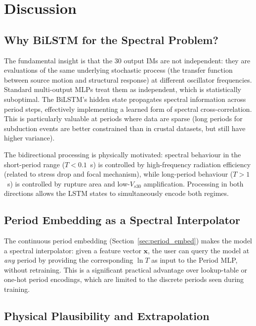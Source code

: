 \documentclass[12pt,a4paper]{article}
\begin{document}
\section{Discussion}
\label{sec:discussion}

\subsection{Why BiLSTM for the Spectral Problem?}

The fundamental insight is that the 30 output IMs are not independent: they
are evaluations of the same underlying stochastic process (the transfer function
between source motion and structural response) at different oscillator
frequencies.
Standard multi-output MLPs treat them as independent, which is statistically
suboptimal.
The BiLSTM's hidden state propagates spectral information across period steps,
effectively implementing a learned form of spectral cross-correlation.
This is particularly valuable at periods where data are sparse (long periods
for subduction events are better constrained than in crustal datasets, but
still have higher variance).

The bidirectional processing is physically motivated: spectral behaviour in
the short-period range ($T < 0.1$~s) is controlled by high-frequency radiation
efficiency (related to stress drop and focal mechanism), while long-period
behaviour ($T > 1$~s) is controlled by rupture area and low-$V_{s30}$
amplification.
Processing in both directions allows the LSTM states to simultaneously encode
both regimes.

\subsection{Period Embedding as a Spectral Interpolator}

The continuous period embedding (Section~\ref{sec:period_embed}) makes the
model a spectral interpolator: given a feature vector $\mathbf{x}$, the user
can query the model at \emph{any} period by providing the corresponding
$\ln T$ as input to the Period MLP, without retraining.
This is a significant practical advantage over lookup-table or one-hot period
encodings, which are limited to the discrete periods seen during training.

\subsection{Physical Plausibility and Extrapolation}
\end{document}
